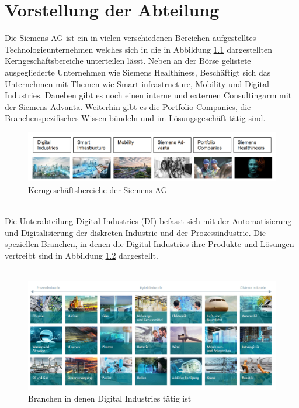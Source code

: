 \chapter{Vorstellung der Abteilung}

Die Siemens AG ist ein in vielen verschiedenen Bereichen aufgestelltes Technologieunternehmen welches sich  in die in Abbildung \ref*{KernSiemens} dargestellten Kerngeschäftsbereiche unterteilen lässt. Neben an der Börse gelistete ausgegliederte Unternehmen wie Siemens Healthiness, Beschäftigt sich das Unternehmen mit Themen wie Smart infrastructure,  Mobility und Digital Industries. Daneben gibt es noch einen interne und externen Consultingarm mit der Siemens Advanta. Weiterhin gibt es die Portfolio Companies, die Branchenspezifisches Wissen bündeln und im Lösungsgeschäft tätig sind. \cite*{SiemensKern} \\
\begin{figure}[!ht]
    \centering
    \includegraphics[width=\textwidth]{Pictures/KernSiemens.png}
    \caption{Kerngeschäftsbereiche der Siemens AG}
    \label{KernSiemens}    
\end{figure} \\
Die Unterabteilung Digital Industries (DI) befasst sich mit der Automatisierung und Digitalisierung der diskreten Industrie und der Prozessindustrie.
Die speziellen Branchen, in denen die Digital Industries ihre Produkte und Lösungen vertreibt sind in Abbildung \ref*{DIBranches} dargestellt. \\
\\
\begin{figure}[!ht]
    \centering
    \includegraphics[width=\textwidth]{Pictures/DIBranches.png}
    \caption{Branchen in denen Digital Industries tätig ist}
    \label{DIBranches}    
\end{figure}
